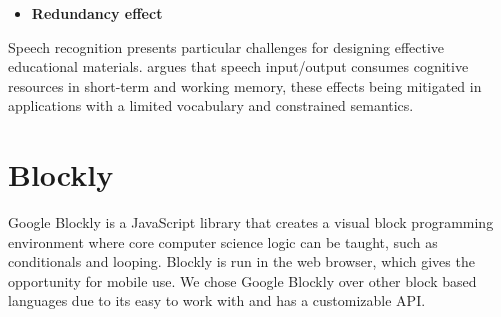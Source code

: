 \documentclass[]{article}
\begin{document}
\begin{itemize}
  \item \textbf{Redundancy effect}
\end{itemize}
   
Speech recognition presents particular challenges for designing effective
educational materials. \cite{Shneiderman:2000:LSR:348941.348990} argues that
speech input/output consumes cognitive resources in short-term and working
memory, these effects being mitigated in applications with a limited vocabulary
and constrained semantics.

\section{Blockly}
Google Blockly is a JavaScript library that creates a visual block programming 
environment where core computer science logic can be taught, such as conditionals and 
looping. Blockly is run in the web browser, which gives the opportunity for mobile use. 
We chose Google Blockly over other block based languages due to its easy to work with and 
has a customizable API.
\end{document}
